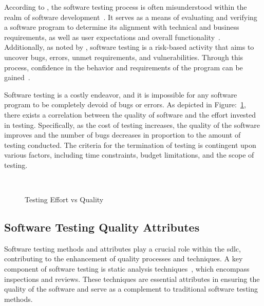 According to \citeauthor{whittaker2000software}, the software testing process is often misunderstood
within the realm of software development~\cite{whittaker2000software}. It serves as a means of
evaluating and verifying a software program to determine its alignment with technical and business
requirements, as well as user expectations and overall functionality~\cite{bentley2005software}.
Additionally, as noted by \citeauthor{jamil2016software}, software testing is a risk-based activity
that aims to uncover bugs, errors, unmet requirements, and vulnerabilities. Through this process,
confidence in the behavior and requirements of the program can be gained~\cite{jamil2016software}.

Software testing is a costly endeavor, and it is impossible for any software program to be completely
devoid of bugs or errors. As depicted in Figure:~\ref{fig:software_testing_quality}, there exists a
correlation between the quality of software and the effort invested in testing. Specifically,
as the cost of testing increases, the quality of the software improves and the number of bugs
decreases in proportion to the amount of testing conducted. The criteria for the termination of
testing is contingent upon various factors, including time constraints, budget limitations, and the
scope of testing.



\begin{figure}[h]
    \caption{Testing Effort vs Quality~\cite{arumugam2019software}}~\label{fig:software_testing_quality}
\end{figure}

\subsection{Software Testing Quality Attributes}

Software testing methods and attributes play a crucial role within the \acrlong{sdlc},
contributing to the enhancement of quality processes and techniques. A key component of software
testing is static analysis techniques~\cite{zheng2006value}, which encompass inspections and reviews.
These techniques are essential attributes in ensuring the quality of the software and serve as a complement to
traditional software testing methods.

